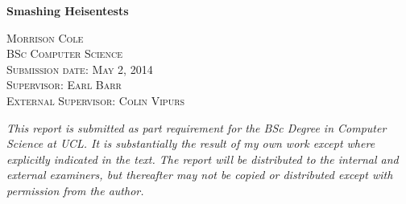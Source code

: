 \label{sec:title}

\begin{titlepage}
\begin{center}

{\huge \bfseries Smashing Heisentests \\[3cm]}

\textsc{\LARGE Morrison Cole}\\[0.5cm]
\textsc{\large BSc Computer Science}\\[0.3cm]
\textsc{\large Submission date: May 2, 2014}\\[2cm]

\textsc{\LARGE Supervisor: Earl Barr}\\[0.5cm]
\textsc{\LARGE External Supervisor: Colin Vipurs}

\vfill

{\itshape This report is submitted as part requirement for the BSc Degree in Computer Science at UCL. It is substantially the result of my own work except where explicitly indicated in the text. The report will be distributed to the internal and external examiners, but thereafter may not be copied or distributed except with permission from the author.}

\end{center}
\end{titlepage}
